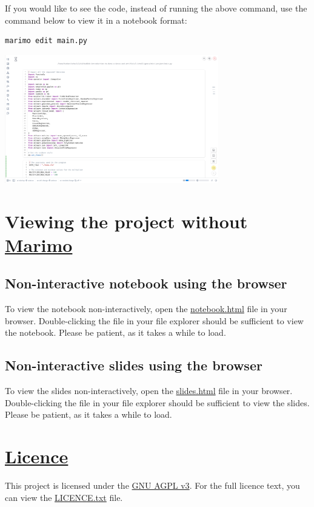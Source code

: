 \documentclass[11pt]{article}
\begin{document}
If you would like to see the code, instead of running
the above command, use the command below to view it
in a notebook format:

\begin{verbatim}
marimo edit main.py
\end{verbatim}

\begin{center}
\includegraphics[height=15em]{./images/result-of-editing-the-notebook.png}
\end{center}
\section{Viewing the project without \href{https://marimo.io/}{Marimo}}
\label{sec:org62133e8}

\subsection{Non-interactive notebook using the browser}
\label{sec:org0b9599e}
To view the notebook non-interactively, open the
\href{./notebook.html}{notebook.html} file in your browser.
Double-clicking the file in your file explorer
should be sufficient to view the notebook.
Please be patient, as it takes a while to load.
\subsection{Non-interactive slides using the browser}
\label{sec:orga7ab930}
To view the slides non-interactively, open the
\href{./slides.html}{slides.html} file in your browser.
Double-clicking the file in your file explorer
should be sufficient to view the slides.
Please be patient, as it takes a while to load.
\section{\href{./LICENCE.txt}{Licence}}
\label{sec:org714e7cd}
This project is licensed under the
\href{https://www.gnu.org/licenses/agpl-3.0.en.html}{GNU AGPL v3}.
For the full licence text, you can view the
\href{./LICENCE.txt}{LICENCE.txt} file.
\end{document}

